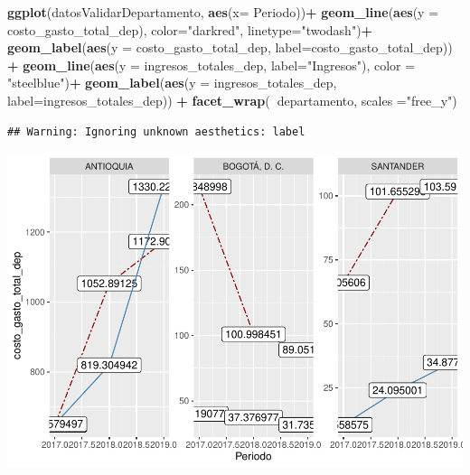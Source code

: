 \documentclass[
  11pt,
]{article}
\newenvironment{Shaded}{\begin{snugshade}}{\end{snugshade}}
\newcommand{\DataTypeTok}[1]{\textcolor[rgb]{0.13,0.29,0.53}{#1}}
\newcommand{\KeywordTok}[1]{\textcolor[rgb]{0.13,0.29,0.53}{\textbf{#1}}}
\newcommand{\NormalTok}[1]{#1}
\newcommand{\OperatorTok}[1]{\textcolor[rgb]{0.81,0.36,0.00}{\textbf{#1}}}
\newcommand{\StringTok}[1]{\textcolor[rgb]{0.31,0.60,0.02}{#1}}
\begin{document}
\begin{Shaded}
\begin{Highlighting}[]
\KeywordTok{ggplot}\NormalTok{(datosValidarDepartamento, }\KeywordTok{aes}\NormalTok{(}\DataTypeTok{x=}\NormalTok{ Periodo))}\OperatorTok{+}
\StringTok{  }\KeywordTok{geom_line}\NormalTok{(}\KeywordTok{aes}\NormalTok{(}\DataTypeTok{y =}\NormalTok{ costo_gasto_total_dep), }\DataTypeTok{color=}\StringTok{"darkred"}\NormalTok{, }\DataTypeTok{linetype=}\StringTok{"twodash"}\NormalTok{)}\OperatorTok{+}
\StringTok{  }\KeywordTok{geom_label}\NormalTok{(}\KeywordTok{aes}\NormalTok{(}\DataTypeTok{y =}\NormalTok{ costo_gasto_total_dep, }\DataTypeTok{label=}\NormalTok{costo_gasto_total_dep)) }\OperatorTok{+}\StringTok{ }
\StringTok{  }\KeywordTok{geom_line}\NormalTok{(}\KeywordTok{aes}\NormalTok{(}\DataTypeTok{y =}\NormalTok{ ingresos_totales_dep, }\DataTypeTok{label=}\StringTok{"Ingresos"}\NormalTok{), }\DataTypeTok{color =} \StringTok{"steelblue"}\NormalTok{)}\OperatorTok{+}
\StringTok{  }\KeywordTok{geom_label}\NormalTok{(}\KeywordTok{aes}\NormalTok{(}\DataTypeTok{y =}\NormalTok{ ingresos_totales_dep, }\DataTypeTok{label=}\NormalTok{ingresos_totales_dep)) }\OperatorTok{+}\StringTok{ }
\StringTok{  }\KeywordTok{facet_wrap}\NormalTok{(}\OperatorTok{~}\NormalTok{departamento, }\DataTypeTok{scales =}\StringTok{"free_y"}\NormalTok{)}
\end{Highlighting}
\end{Shaded}

\begin{verbatim}
## Warning: Ignoring unknown aesthetics: label
\end{verbatim}

\includegraphics{index_files/figure-latex/unnamed-chunk-5-2.pdf}
\end{document}
